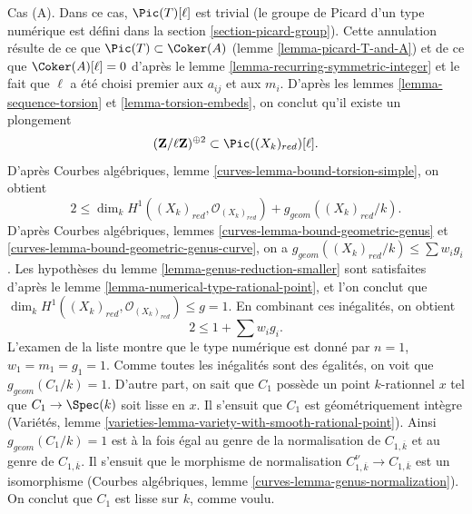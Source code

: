 \medskip\noindent
Cas (A). Dans ce cas, $\Pic(T)[\ell]$ est trivial (le groupe de Picard d'un
type numérique est défini dans la section \ref{section-picard-group}).
Cette annulation résulte de ce que $\Pic(T)\subset\Coker(A)$ (lemme
\ref{lemma-picard-T-and-A}) et de ce que $\Coker(A)[\ell]=0$ d'après le
lemme \ref{lemma-recurring-symmetric-integer} et le fait que $\ell$ a été
choisi premier aux $a_{ij}$ et aux $m_i$. D'après les lemmes
\ref{lemma-sequence-torsion} et \ref{lemma-torsion-embeds}, on conclut qu'il
existe un plongement
$$
(\mathbf{Z}/\ell \mathbf{Z})^{\oplus 2} \subset \Pic((X_k)_{red})[\ell].
$$
D'après Courbes algébriques, lemme
\ref{curves-lemma-bound-torsion-simple}, on obtient
$$
2 \leq \dim_k H^1((X_k)_{red}, \mathcal{O}_{(X_k)_{red}}) +
g_{geom}((X_k)_{red}/k).
$$
D'après Courbes algébriques, lemmes
\ref{curves-lemma-bound-geometric-genus} et
\ref{curves-lemma-bound-geometric-genus-curve}, on a
$g_{geom}((X_k)_{red}/k)\leq\sum w_ig_i$. Les hypothèses du lemme
\ref{lemma-genus-reduction-smaller} sont satisfaites d'après le lemme
\ref{lemma-numerical-type-rational-point}, et l'on conclut que
$\dim_kH^1((X_k)_{red},\mathcal{O}_{(X_k)_{red}})\leq g=1$.
En combinant ces inégalités, on obtient
$$
2 \leq 1 + \sum w_i g_i.
$$
L'examen de la liste montre que le type numérique est donné par
$n=1$, $w_1=m_1=g_1=1$. Comme toutes les inégalités sont des égalités,
on voit que $g_{geom}(C_1/k)=1$. D'autre part, on sait que $C_1$ possède
un point $k$-rationnel $x$ tel que $C_1\to\Spec(k)$ soit lisse en $x$.
Il s'ensuit que $C_1$ est géométriquement intègre (Variétés, lemme
\ref{varieties-lemma-variety-with-smooth-rational-point}). Ainsi
$g_{geom}(C_1/k)=1$ est à la fois égal au genre de la normalisation de
$C_{1,\overline{k}}$ et au genre de $C_{1,\overline{k}}$. Il s'ensuit que
le morphisme de normalisation
$C_{1,\overline{k}}^\nu\to C_{1,\overline{k}}$ est un isomorphisme
(Courbes algébriques, lemme \ref{curves-lemma-genus-normalization}). On
conclut que $C_1$ est lisse sur $k$, comme voulu.

